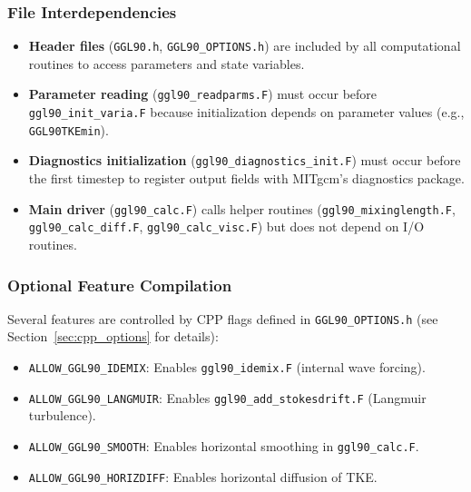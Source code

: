 \documentclass[12pt,letterpaper]{article}
\begin{document}
\subsubsection{File Interdependencies}

\begin{itemize}[leftmargin=*]
  \item \textbf{Header files} (\texttt{GGL90.h}, \texttt{GGL90\_OPTIONS.h})
        are included by all computational routines to access parameters and
        state variables.

  \item \textbf{Parameter reading} (\texttt{ggl90\_readparms.F}) must occur
        before \texttt{ggl90\_init\_varia.F} because initialization depends
        on parameter values (e.g., \texttt{GGL90TKEmin}).

  \item \textbf{Diagnostics initialization} (\texttt{ggl90\_diagnostics\_init.F})
        must occur before the first timestep to register output fields with
        MITgcm's diagnostics package.

  \item \textbf{Main driver} (\texttt{ggl90\_calc.F}) calls helper routines
        (\texttt{ggl90\_mixinglength.F}, \texttt{ggl90\_calc\_diff.F},
        \texttt{ggl90\_calc\_visc.F}) but does not depend on I/O routines.
\end{itemize}

\subsubsection{Optional Feature Compilation}

Several features are controlled by CPP flags defined in
\texttt{GGL90\_OPTIONS.h} (see Section~\ref{sec:cpp_options} for details):

\begin{itemize}[leftmargin=*]
  \item \texttt{ALLOW\_GGL90\_IDEMIX}: Enables \texttt{ggl90\_idemix.F}
        (internal wave forcing).
  \item \texttt{ALLOW\_GGL90\_LANGMUIR}: Enables
        \texttt{ggl90\_add\_stokesdrift.F} (Langmuir turbulence).
  \item \texttt{ALLOW\_GGL90\_SMOOTH}: Enables horizontal smoothing in
        \texttt{ggl90\_calc.F}.
  \item \texttt{ALLOW\_GGL90\_HORIZDIFF}: Enables horizontal diffusion of TKE.
\end{itemize}
\end{document}
